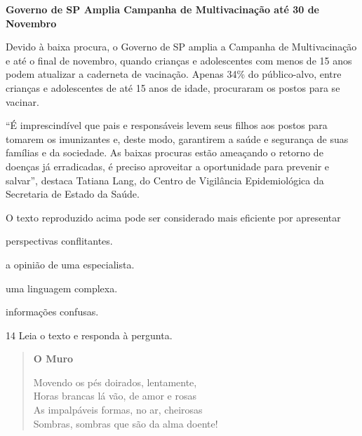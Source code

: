 \begin{myquote}
\textbf{Governo de SP Amplia Campanha de Multivacinação até 30 de Novembro}

Devido à baixa procura, o Governo de SP amplia a Campanha de
Multivacinação e até o final de novembro, quando crianças e adolescentes
com menos de 15 anos podem atualizar a caderneta de vacinação. Apenas
34\% do público-alvo, entre crianças e adolescentes de até 15 anos de
idade, procuraram os postos para se vacinar.

``É imprescindível que pais e responsáveis levem seus filhos aos postos
para tomarem os imunizantes e, deste modo, garantirem a saúde e
segurança de suas famílias e da sociedade. As baixas procuras estão
ameaçando o retorno de doenças já erradicadas, é preciso aproveitar a
oportunidade para prevenir e salvar'', destaca Tatiana Lang, do Centro de
Vigilância Epidemiológica da Secretaria de Estado da Saúde.

\end{myquote}

O texto reproduzido acima pode ser considerado mais eficiente por
apresentar

\begin{escolha}
  \item perspectivas conflitantes.

  \item a opinião de uma especialista.

  \item uma linguagem complexa.

  \item informações confusas.
\end{escolha}

\num{14} Leia o texto e responda à pergunta.

\begin{myquote}
\begin{verse}
\textbf{O Muro}

Movendo os pés doirados, lentamente,\\
Horas brancas lá vão, de amor e rosas\\
As impalpáveis formas, no ar, cheirosas\\
Sombras, sombras que são da alma doente!
\end{verse}

\end{myquote}

